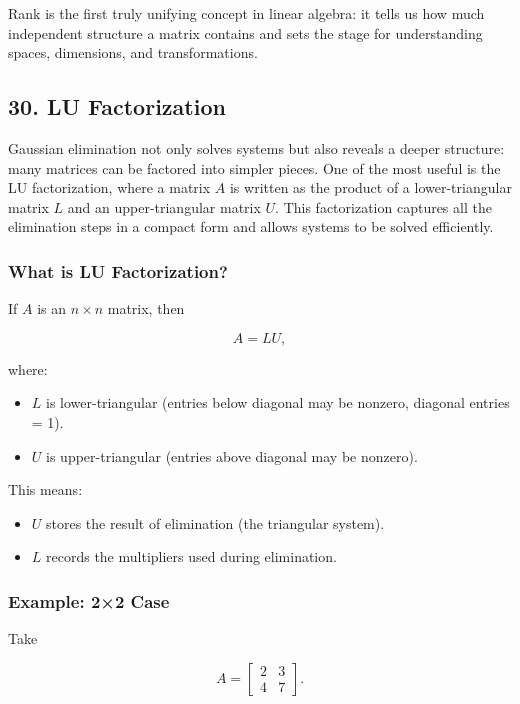 \documentclass[
  letterpaper,
  DIV=11,
  numbers=noendperiod]{scrreprt}
\providecommand{\tightlist}{%
  \setlength{\itemsep}{0pt}\setlength{\parskip}{0pt}}
\begin{document}
Rank is the first truly unifying concept in linear algebra: it tells us
how much independent structure a matrix contains and sets the stage for
understanding spaces, dimensions, and transformations.

\subsection{30. LU Factorization}\label{lu-factorization}

Gaussian elimination not only solves systems but also reveals a deeper
structure: many matrices can be factored into simpler pieces. One of the
most useful is the LU factorization, where a matrix \(A\) is written as
the product of a lower-triangular matrix \(L\) and an upper-triangular
matrix \(U\). This factorization captures all the elimination steps in a
compact form and allows systems to be solved efficiently.

\subsubsection{What is LU
Factorization?}\label{what-is-lu-factorization}

If \(A\) is an \(n \times n\) matrix, then

\[
A = LU,
\]

where:

\begin{itemize}
\tightlist
\item
  \(L\) is lower-triangular (entries below diagonal may be nonzero,
  diagonal entries = 1).
\item
  \(U\) is upper-triangular (entries above diagonal may be nonzero).
\end{itemize}

This means:

\begin{itemize}
\tightlist
\item
  \(U\) stores the result of elimination (the triangular system).
\item
  \(L\) records the multipliers used during elimination.
\end{itemize}

\subsubsection{Example: 2×2 Case}\label{example-22-case}

Take

\[
A = \begin{bmatrix}  
2 & 3 \\  
4 & 7  
\end{bmatrix}.
\]
\end{document}
